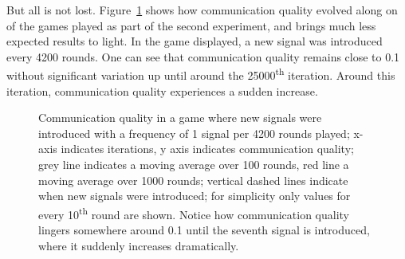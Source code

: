 \documentclass[DIV=calc,BCOR=0mm,pagesize]{scrartcl}
\begin{document}
But all is not lost.
Figure~\ref{fig:com} shows how communication quality evolved along on of the games played as part of the second experiment, and brings much less expected results to light.
In the game displayed, a new signal was introduced every 4200 rounds.
One can see that communication quality remains close to 0.1 without significant variation up until around the 25000\textsuperscript{th} iteration.
Around this iteration, communication quality experiences a sudden increase.

\begin{figure}
	\centering
	\caption{Communication quality in a game where new signals were introduced with a frequency of 1 signal per 4200 rounds played; x-axis indicates iterations, y axis indicates communication quality; grey line indicates a moving average over 100 rounds, red line a moving average over 1000 rounds; vertical dashed lines indicate when new signals were introduced; for simplicity only values for every 10\textsuperscript{th} round are shown. Notice how communication quality lingers somewhere around 0.1 until the seventh signal is introduced, where it suddenly increases dramatically.}
	\label{fig:com}
\end{figure}
\end{document}
